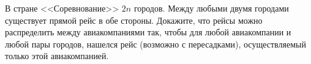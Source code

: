 В стране <<Соревнование>> $2n$ городов. Между любыми двумя городами существует прямой рейс в обе стороны.
Докажите, что рейсы можно распределить между авиакомпаниями так, чтобы для любой авиакомпании и любой
пары городов, нашелся рейс (возможно с пересадками), осуществляемый только этой авиакомпанией.